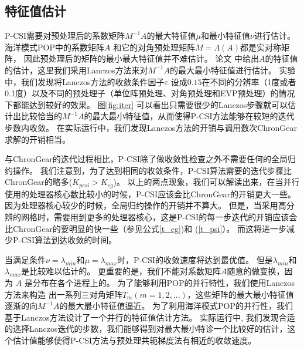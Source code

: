 \subsection{特征值估计}
\label{precond:pcsi:eigs}
P-CSI需要对预处理后的系数矩阵$M^{-1}A$的最大特征值$\mu$和最小特征值$\nu$进行估计。 
海洋模式POP中的系数矩阵$A$ 和它的对角预处理矩阵$M = \Lambda(A)$都是实对称矩阵， 因此预处理后的矩阵的最小最大特征值并不难估计。 
论文\cite{hu2013scalable} 中给出$A$的特征值的估计，这里我们采用Lanczos方法\cite{Paige1980235}来对$M^{-1}A$的最大最小特征值进行估计。
实验中，我们发现将Lanczos方法的收敛条件因子$\varepsilon$ 设成$0.15$在不同的分辨率（1度或者0.1度）以及不同的预处理子（单位阵预处理、对角预处理和EVP预处理）的情况下都能达到较好的效果。 
图\ref{fig:iter} 可以看出只需要很少的Lanczos步骤就可以估计出比较恰当的$M^{-1}A$的最大最小特征值，从而使得P-CSI方法能够在较短的迭代步数内收敛。
在实际运行中，我们发现Lanczos方法的开销与调用数次ChronGear求解的开销相当。 

与ChronGear的迭代过程相比，P-CSI除了做收敛性检查之外不需要任何的全局归约操作。 
我们注意到，为了达到相同的收敛条件，P-CSI算法需要的迭代步骤比ChronGear的略多($K_{pcsi} > K_{cg}$)。 
以上的两点现象，我们可以解读出来，在当并行使用的处理器核心数比较小的时候，P-CSI应该会比ChronGear的开销更大一些。
因为处理器核心较少的时候，全局归约操作的开销并不算大。 
但是，当采用高分辨的网格时，需要用到更多的处理器核心，这是P-CSI的每一步迭代的开销应该会比ChronGear的要明显的快一些（参见公式\ref{t_cg})和
(\ref{t_psi}）。
而这将进一步减少P-CSI算法到达收敛的时间。 

当满足条件$\nu = \lambda_{min}$和$\mu =\lambda_{max}$时，P-CSI的收敛速度将达到最优值。 
但是$\lambda_{min}$和$\lambda_{max}$是比较难以估计的。
更重要的是，我们不能对系数矩阵$A$随意的做变换，因为 $A$ 是分布在各个进程上的。
为了能够利用POP的并行特性，我们使用Lanczos方法来构造 出一系列三对角矩阵$T_m (m=1,2,...)$，这些矩阵的最大最小特征值逐渐的向$M^{-1}A$的最大最小特征值逼近。
为了利用海洋模式POP的并行性，我们基于Lanczos方法设计了一个并行的特征值估计方法。
实际运行中, 我们发现合适的选择Lanczos迭代的步数，我们能够得到对最大最小特诊一个比较好的估计，这个估计值能够使得P-CSI方法与预处理共轭梯度法有相近的收敛速度。  


